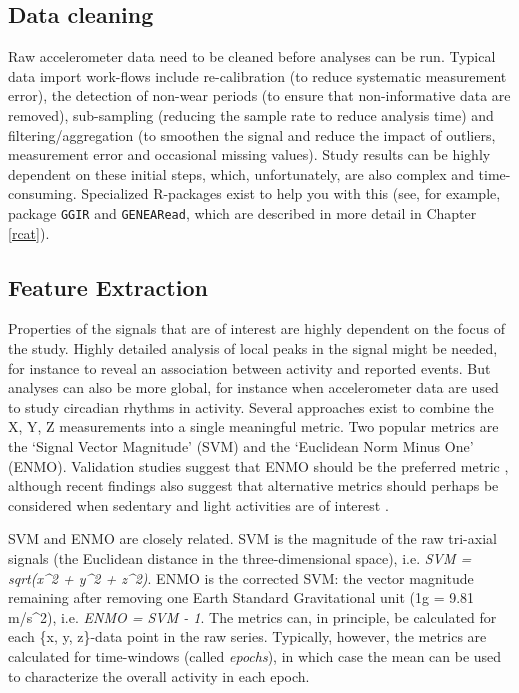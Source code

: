 \documentclass[]{book}
\begin{document}
\subsection{Data cleaning}\label{data-cleaning}

Raw accelerometer data need to be cleaned before analyses can be run.
Typical data import work-flows include re-calibration (to reduce
systematic measurement error), the detection of non-wear periods (to
ensure that non-informative data are removed), sub-sampling (reducing
the sample rate to reduce analysis time) and filtering/aggregation (to
smoothen the signal and reduce the impact of outliers, measurement error
and occasional missing values). Study results can be highly dependent on
these initial steps, which, unfortunately, are also complex and
time-consuming. Specialized R-packages exist to help you with this (see,
for example, package \texttt{GGIR} and \texttt{GENEARead}, which are
described in more detail in Chapter \ref{rcat}).

\subsection{Feature Extraction}\label{feature-extraction}

 

Properties of the signals that are of interest are highly dependent on
the focus of the study. Highly detailed analysis of local peaks in the
signal might be needed, for instance to reveal an association between
activity and reported events. But analyses can also be more global, for
instance when accelerometer data are used to study circadian rhythms in
activity. Several approaches exist to combine the X, Y, Z measurements
into a single meaningful metric. Two popular metrics are the `Signal
Vector Magnitude' (SVM) and the `Euclidean Norm Minus One' (ENMO).
Validation studies suggest that ENMO should be the preferred metric
\citep{VanHeest2014, VanHeest2015}, although recent findings also
suggest that alternative metrics should perhaps be considered when
sedentary and light activities are of interest \citep{Bai2016}.

SVM and ENMO are closely related. SVM is the magnitude of the raw
tri-axial signals (the Euclidean distance in the three-dimensional
space), i.e. \emph{SVM = sqrt(x\^{}2 + y\^{}2 + z\^{}2)}. ENMO is the
corrected SVM: the vector magnitude remaining after removing one Earth
Standard Gravitational unit (1g = 9.81 m/s\^{}2), i.e. \emph{ENMO = SVM
- 1}. The metrics can, in principle, be calculated for each \{x, y,
z\}-data point in the raw series. Typically, however, the metrics are
calculated for time-windows (called \emph{epochs}), in which case the
mean can be used to characterize the overall activity in each epoch.
\end{document}
